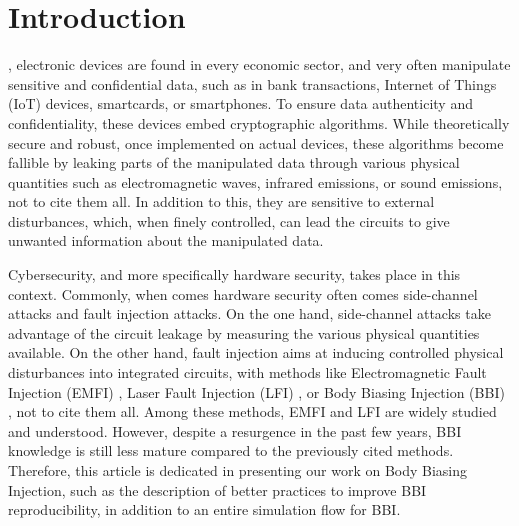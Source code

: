 
\section{Introduction}

	, electronic devices are found in every economic sector, and very often manipulate sensitive and confidential data, such as in bank transactions, Internet of Things (IoT) devices, smartcards, or smartphones.
	To ensure data authenticity and confidentiality, these devices embed cryptographic algorithms.
	While theoretically secure and robust, once implemented on actual devices, these algorithms become fallible by leaking parts of the manipulated data through various physical quantities such as electromagnetic waves, infrared emissions, or sound emissions, not to cite them all.
	In addition to this, they are sensitive to external disturbances, which, when finely controlled, can lead the circuits to give unwanted information about the manipulated data.

	Cybersecurity, and more specifically hardware security, takes place in this context.
	Commonly, when comes hardware security often comes side-channel attacks and fault injection attacks.
	On the one hand, side-channel attacks take advantage of the circuit leakage by measuring the various physical quantities available.
	On the other hand, fault injection aims at inducing controlled physical disturbances into integrated circuits, with methods like Electromagnetic Fault Injection (EMFI) \cite{mathieuEMFIFirst, mathieuEMFI}, Laser Fault Injection (LFI) \cite{lfiFaultModel}, or Body Biasing Injection (BBI) \cite{bbiOrigin}, not to cite them all.
	Among these methods, EMFI and LFI are widely studied and understood.
	However, despite a resurgence in the past few years, BBI knowledge is still less mature compared to the previously cited methods.
	Therefore, this article is dedicated in presenting our work on Body Biasing Injection, such as the description of better practices to improve BBI reproducibility, in addition to an entire simulation flow for BBI.

